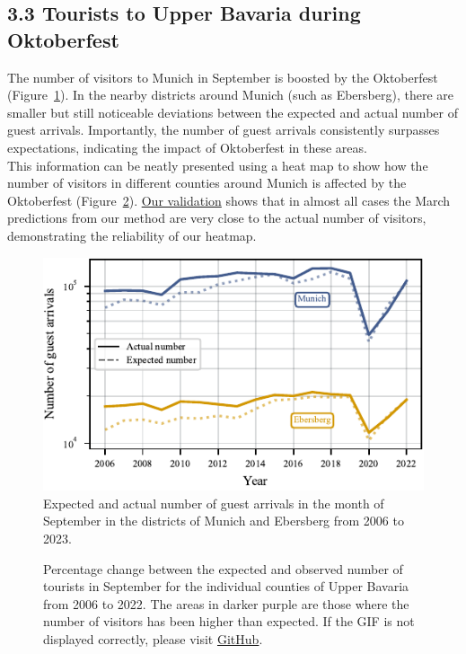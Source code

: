\documentclass{article}
\theoremstyle{plain}
\theoremstyle{definition}
\theoremstyle{remark}
\begin{document}
\subsection*{3.3 Tourists to Upper Bavaria during Oktoberfest}
The number of visitors to Munich in September is boosted by the Oktoberfest (Figure~\ref{fig:exp_vs_actual_arrivals}). In the nearby districts around Munich (such as Ebersberg), there are smaller but still noticeable deviations between the expected and actual number of guest arrivals. Importantly, the number of guest arrivals consistently surpasses expectations, indicating the impact of Oktoberfest in these areas.\\
This information can be neatly presented using a heat map to show how the number of visitors in different counties around Munich is affected by the Oktoberfest (Figure~\ref{fig:heatmap}). \href{https://github.com/JuliaGraf/Data-Literacy-Report/blob/29b5d6d1b380344bcc617fa75a9feec995fd2069/doc/fig/validation_zoom.pdf}{Our validation} shows that in almost all cases the March predictions from our method are very close to the actual number of visitors, demonstrating the reliability of our heatmap.
\begin{figure}[ht] %
\includegraphics{fig/actual_vs_expected_arrivals.pdf} %
\caption{Expected and actual number of guest arrivals in the month of September in the districts of Munich and Ebersberg from 2006 to 2023.}
\label{fig:exp_vs_actual_arrivals}
\end{figure}
\begin{figure}[ht]
  \centering
  \caption{Percentage change between the expected and observed number of tourists in September for the individual counties of Upper Bavaria from 2006 to 2022. The areas in darker purple are those where the number of visitors has been higher than expected. If the GIF is not displayed correctly, please visit \href{https://github.com/JuliaGraf/Data-Literacy-Report/blob/b13d5f18d5c95ca0100450f6b692807ec280bffd/doc/fig/GifMap.gif}{GitHub}.}
  \label{fig:heatmap}
\end{figure}
\end{document}
